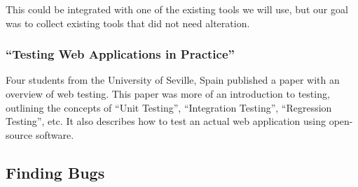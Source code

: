 \documentclass[11pt]{article}
\begin{document}
This could be integrated with one of the existing tools we will use, but our goal was to collect existing tools that did not need alteration.

\subsubsection{``Testing Web Applications in Practice'' \cite{TestingInPractice}}
Four students from the University of Seville, Spain published a paper with an overview of web testing. This paper was more of an introduction to testing, outlining the concepts of “Unit Testing”, “Integration Testing”, “Regression Testing”, etc. It also describes how to test an actual web application using open-source software.


\subsubsection{\cite{ContractDrivenTesting}}

\subsubsection{\cite{JAWS}}

\subsubsection{\cite{WebMate}}

\subsubsection{\cite{BookContinuousTesting}}


\subsection{Finding Bugs}
\subsubsection{\cite{FindingBugs}}

\subsubsection{\cite{TestingWebServicesSurvey}}

\subsubsection{\cite{RESTfulFramework}}
\end{document}
